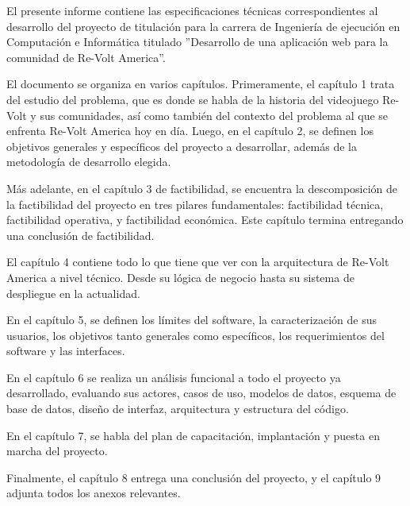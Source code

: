 El presente informe contiene las especificaciones técnicas correspondientes al desarrollo del proyecto de titulación para la carrera de Ingeniería de ejecución en Computación e Informática titulado ''Desarrollo de una aplicación web para la comunidad de Re-Volt America''.

El documento se organiza en varios capítulos. Primeramente, el capítulo 1 trata del estudio del problema, que es donde se habla de la historia del videojuego Re-Volt y sus comunidades, así como también del contexto del problema al que se enfrenta Re-Volt America hoy en día. Luego, en el capítulo 2, se definen los objetivos generales y específicos del proyecto a desarrollar, además de la metodología de desarrollo elegida.

Más adelante, en el capítulo 3 de factibilidad, se encuentra la descomposición de la factibilidad del proyecto en tres pilares fundamentales: factibilidad técnica, factibilidad operativa, y factibilidad económica. Este capítulo termina entregando una conclusión de factibilidad.

El capítulo 4 contiene todo lo que tiene que ver con la arquitectura de Re-Volt America a nivel técnico. Desde su lógica de negocio hasta su sistema de despliegue en la actualidad.

En el capítulo 5, se definen los límites del software, la caracterización de sus usuarios, los objetivos tanto generales como específicos, los requerimientos del software y las interfaces.

En el capítulo 6 se realiza un análisis funcional a todo el proyecto ya desarrollado, evaluando sus actores, casos de uso, modelos de datos, esquema de base de datos, diseño de interfaz, arquitectura y estructura del código.

En el capítulo 7, se habla del plan de capacitación, implantación y puesta en marcha del proyecto.

Finalmente, el capítulo 8 entrega una conclusión del proyecto, y el capítulo 9 adjunta todos los anexos relevantes.
